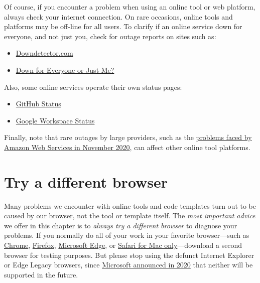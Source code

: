 \documentclass[
  english,
]{book}
\providecommand{\tightlist}{%
  \setlength{\itemsep}{0pt}\setlength{\parskip}{0pt}}
\begin{document}
Of course, if you encounter a problem when using an online tool or web platform, always check your internet connection. On rare occasions, online tools and platforms may be off-line for all users. To clarify if an online service down for everyone, and not just you, check for outage reports on sites such as:

\begin{itemize}
\tightlist
\item
  \href{https://downdetector.com}{Downdetector.com}
\item
  \href{https://downforeveryoneorjustme.com}{Down for Everyone or Just Me?}
\end{itemize}

Also, some online services operate their own status pages:

\begin{itemize}
\tightlist
\item
  \href{https://www.githubstatus.com}{GitHub Status}
\item
  \href{https://www.google.com/appsstatus}{Google Workspace Status}
\end{itemize}

Finally, note that rare outages by large providers, such as the \href{https://www.washingtonpost.com/business/economy/amazon-web-services-outage-stymies-businesses/2020/11/25/b54a6106-2f4f-11eb-860d-f7999599cbc2_story.html}{problems faced by Amazon Web Services in November 2020}, can affect other online tool platforms.

\hypertarget{fix-browser}{%
\section{Try a different browser}\label{fix-browser}}

Many problems we encounter with online tools and code templates turn out to be caused by our browser, not the tool or template itself. The \emph{most important advice} we offer in this chapter is to \emph{always try a different browser} to diagnose your problems. If you normally do all of your work in your favorite browser---such as \href{https://www.google.com/chrome/}{Chrome}, \href{https://www.mozilla.org/en-US/firefox/}{Firefox}, \href{https://www.microsoft.com/en-us/edge}{Microsoft Edge}, or \href{https://www.apple.com/safari/}{Safari for Mac only}---download a second browser for testing purposes. But please stop using the defunct Internet Explorer or Edge Legacy browsers, since \href{https://docs.microsoft.com/en-us/lifecycle/faq/internet-explorer-microsoft-edge}{Microsoft announced in 2020} that neither will be supported in the future.
\end{document}
